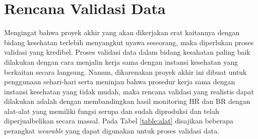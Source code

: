 \section{Rencana Validasi Data}
Mengingat bahwa proyek akhir yang akan dikerjakan erat kaitannya dengan bidang kesehatan terlebih menyangkut nyawa seseorang, maka diperlukan proses validasi yang kredibel. Proses validasi data dalam bidang kesahatan paling baik dilakukan dengan cara menjalin kerja sama dengan instansi kesehatan yang berkaitan secara langsung. Namun, dikarenakan proyek akhir ini dibuat untuk penggunaan sehari-hari serta meninjau bahwa prosedur kerja sama dengan instansi kesehatan yang tidak mudah, maka rencana validasi yang realistis dapat dilakukan adalah dengan membandingkan hasil monitoring HR dan BR dengan alat-alat yang memiliki fungsi serupa dan sudah diproduksi dan telah diperjualbelikan secara massal. Pada Tabel \ref{table:alat} disajikan beberapa perangkat \textit{wearable} yang dapat digunakan untuk proses validasi data.

\begin{table}[ht]
\vspace{0.8em}
\caption[Perangkat \textit{Wearable} untuk Pengukuran HR dan BR]{Perangkat \textit{Wearable} komersial untuk Pengukuran HR dan BR}
\centering
\label{table:alat}
\end{table}

